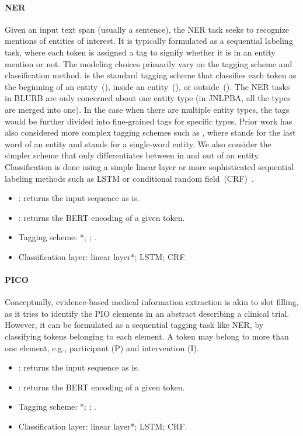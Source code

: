 \documentclass[acmlarge,screen,nonacm]{acmart}
\begin{document}
\paragraph{NER} Given an input text span (usually a sentence), the NER task seeks to recognize mentions of entities of interest. It is typically formulated as a sequential labeling task, where each token is assigned a tag to signify whether it is in an entity mention or not. The modeling choices primarily vary on the tagging scheme and classification method.  is the standard tagging scheme that classifies each token as the beginning of an entity~(), inside an entity~(), or outside~(). The NER tasks in BLURB are only concerned about one entity type (in JNLPBA, all the types are merged into one). In the case when there are multiple entity types, the  tags would be further divided into fine-grained tags for specific types. Prior work has also considered more complex tagging schemes such as , where  stands for the last word of an entity and  stands for a single-word entity. We also consider the simpler  scheme that only differentiates between in and out of an entity. Classification is done using a simple linear layer or more sophisticated sequential labeling methods such as LSTM or conditional random field~(CRF)~\cite{Lafferty01conditionalrandom}.


\begin{itemize}
    \item : returns the input sequence as is.
    \item : returns the BERT encoding of a given token.
    \item Tagging scheme: *; ; .
    \item Classification layer: linear layer*; LSTM; CRF.
\end{itemize}

\paragraph{PICO} Conceptually, evidence-based medical information extraction is akin to slot filling, as it tries to identify the PIO elements in an abstract describing a clinical trial. However, it can be formulated as a sequential tagging task like NER, by classifying tokens belonging to each element. A token may belong to more than one element, e.g., participant (P) and intervention (I).  
\begin{itemize}
    \item : returns the input sequence as is.
    \item : returns the BERT encoding of a given token.
    \item Tagging scheme: *; ; .
    \item Classification layer: linear layer*; LSTM; CRF.
\end{itemize}
\end{document}
